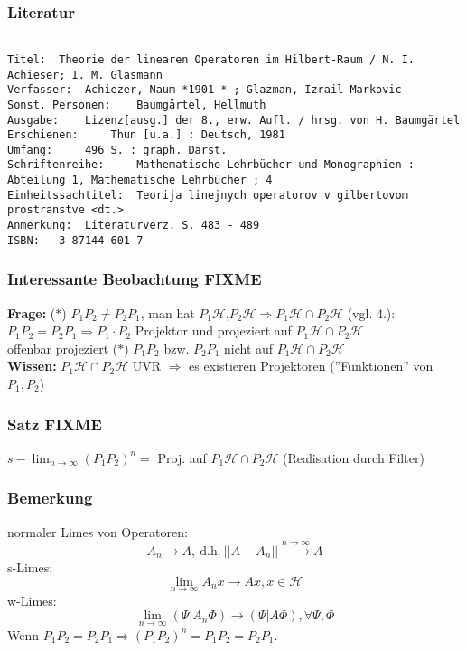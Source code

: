 \documentclass[twoside,a4paper]{scrartcl}
\renewcommand{\1}{\mathds{1}}
\newcommand{\Ra}{\Rightarrow}
\newcommand{\ra}{\rightarrow}
\renewcommand{\H}{\mathcal{H}}
\begin{document}
\subsubsection*{Literatur}
\begin{tiny}
\begin{tiny}
\begin{verbatim}

Titel: 	Theorie der linearen Operatoren im Hilbert-Raum / N. I. Achieser; I. M. Glasmann
Verfasser: 	Achiezer, Naum *1901-* ; Glazman, Izrail Markovic
Sonst. Personen: 	Baumgärtel, Hellmuth
Ausgabe: 	Lizenz[ausg.] der 8., erw. Aufl. / hrsg. von H. Baumgärtel
Erschienen: 	Thun [u.a.] : Deutsch, 1981
Umfang: 	496 S. : graph. Darst.
Schriftenreihe: 	Mathematische Lehrbücher und Monographien : Abteilung 1, Mathematische Lehrbücher ; 4
Einheitssachtitel: 	Teorija linejnych operatorov v gilbertovom prostranstve <dt.>
Anmerkung: 	Literaturverz. S. 483 - 489
ISBN: 	3-87144-601-7
\end{verbatim}
\end{tiny}

\end{tiny}

\subsubsection*{Interessante Beobachtung FIXME}
\textbf{Frage:} ($*$) $P_1P_2 \neq P_2P_1$, man hat $P_1\H$,$P_2\H \Ra P_1\H \cap P_2 \H$ (vgl. 4.):\\
$P_1P_2=P_2P_1 \Ra P_1\cdot P_2$ Projektor und projeziert auf $P_1\H \cap P_2\H$\\
offenbar projeziert ($*$) $P_1P_2$ bzw. $P_2P_1$ nicht auf $P_1\H \cap P_2\H$\\
\textbf{Wissen:} $P_1\H \cap P_2\H$ UVR $\Ra$ es existieren Projektoren (''Funktionen'' von $P_1,P_2$)

\subsubsection*{Satz FIXME}
$s-\lim_{n \ra \infty} (P_1P_2)^n=$ Proj. auf $P_1\H \cap P_2\H$ (Realisation durch Filter)

\subsubsection*{Bemerkung}
normaler Limes von Operatoren:\\
$$A_n \ra A, \ \mathrm{d.h.} \ ||A-A_n|| \stackrel{n \ra \infty}{\ra}A $$
s-Limes:\\
$$\lim_{n \ra \infty}A_nx \ra Ax, x \in \H$$
w-Limes:\\
$$\lim_{n \ra \infty} (\Psi|A_n \Phi) \ra (\Psi|A \Phi), \forall \Psi, \Phi$$
Wenn $P_1P_2=P_2P_1 \Ra (P_1P_2)^n=P_1P_2=P_2P_1$.
\end{document}
